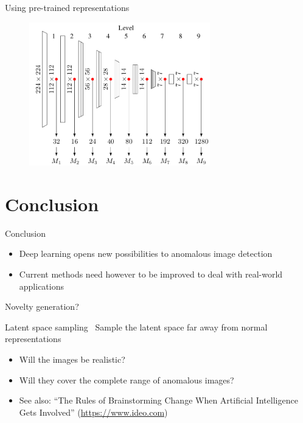 \documentclass[xcolor=pdftex,dvipsnames,table,mathserif]{beamer}
\begin{document}
\begin{frame}{Using pre-trained representations~\cite{rippel_modeling_2020}}

\begin{figure}[ht]
  \centering
  \includegraphics[width=0.7\textwidth]{enb0_features}
\end{figure}


\end{frame}



\section{Conclusion}

\begin{frame}{Conclusion}

\begin{itemize}
\item Deep learning opens new possibilities to anomalous image detection
\item Current methods need however to be improved to deal with real-world applications
\end{itemize}

\end{frame}


\begin{frame}{Novelty generation?}

  \begin{block}{Latent space sampling~\cite{cherti_out--class_2017}}
    Sample the latent space far away from normal representations
    \begin{itemize}
    \item Will the images be realistic?
    \item Will they cover the complete range of anomalous images?
    \end{itemize}
  \end{block}

\begin{itemize}
\item See also: ``The Rules of Brainstorming Change When Artificial Intelligence Gets Involved'' (\url{https://www.ideo.com})
\end{itemize}

\end{frame}
\end{document}
